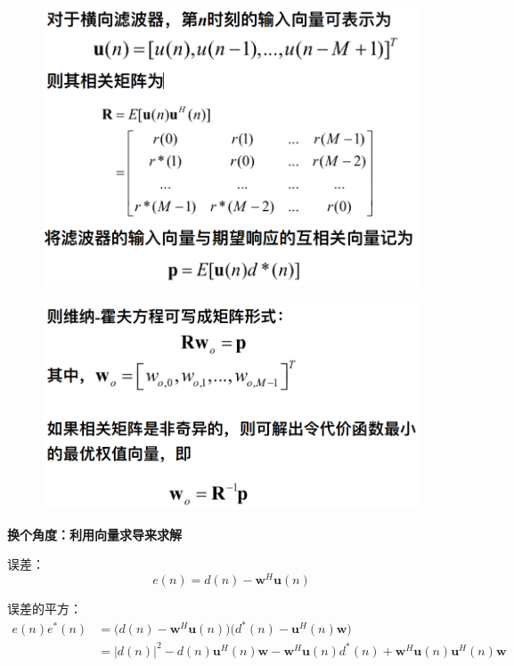 \documentclass[UTF8]{ctexart} %
\begin{document}
			\begin{figure}[H]
				\centering\includegraphics[scale=0.3]{16.png}
			\end{figure}
			\begin{figure}[H]
				\centering\includegraphics[scale=0.3]{17.png}
			\end{figure}
			
			\textbf{换个角度：利用向量求导来求解}
			
			误差：
			\[e(n) = d(n)-\textbf{w}^H\textbf{u}(n)\]
			
			误差的平方：
			\[\begin{aligned}
			e(n)e^*(n) &= \Big(d(n)-\textbf{w}^H\textbf{u}(n)\Big) \Big(d^*(n)-\textbf{u}^H(n)\textbf{w}\Big)\\
			&=|d(n)|^2 -d(n)\textbf{u}^H(n)\textbf{w}-\textbf{w}^H\textbf{u}(n)d^*(n) + \textbf{w}^H\textbf{u}(n)\textbf{u}^H(n)\textbf{w}
			\end{aligned}	
			\]
			
\end{document}

